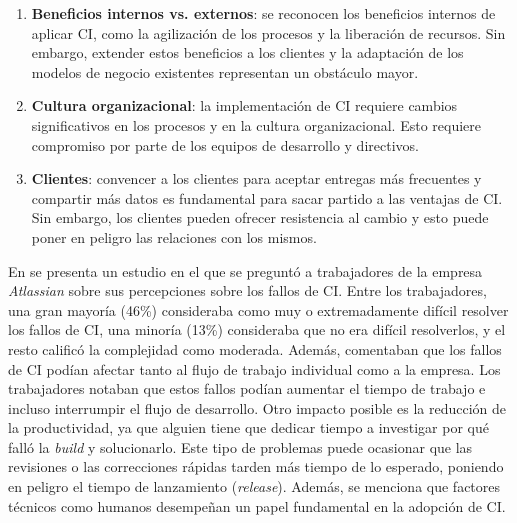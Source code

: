\begin{enumerate}
	\item \textbf{Beneficios internos vs. externos}: se reconocen los beneficios internos de
      aplicar CI, como la agilización de los procesos y la liberación de recursos. Sin
      embargo, extender estos beneficios a los clientes y la adaptación de los modelos de negocio
      existentes representan un obstáculo mayor.
	\item \textbf{Cultura organizacional}: la implementación de CI requiere cambios
      significativos en los procesos y en la cultura organizacional. Esto requiere compromiso por
      parte de los equipos de desarrollo y directivos.
	\item \textbf{Clientes}: convencer a los clientes para aceptar entregas más frecuentes y
      compartir más datos es fundamental para sacar partido a las ventajas de CI. Sin
      embargo, los clientes pueden ofrecer resistencia al cambio y esto puede poner en peligro
      las relaciones con los mismos.
\end{enumerate}

En \cite{17} se presenta un estudio en el que se preguntó a trabajadores de la empresa
\textit{Atlassian} sobre sus percepciones sobre los fallos de CI. Entre los trabajadores,
una gran mayoría (46\%) consideraba como muy o extremadamente difícil resolver los fallos de
CI, una minoría (13\%) consideraba que no era difícil resolverlos, y el resto calificó
la complejidad como moderada. Además, comentaban que los fallos de CI podían afectar tanto
al flujo de trabajo individual como a la empresa. Los trabajadores notaban que estos fallos podían
aumentar el tiempo de trabajo e incluso interrumpir el flujo de desarrollo. Otro impacto posible
es la reducción de la productividad, ya que alguien tiene que dedicar tiempo a investigar por qué
falló la \textit{build} y solucionarlo. Este tipo de problemas puede ocasionar que las revisiones
o las correcciones rápidas tarden más tiempo de lo esperado, poniendo en peligro el tiempo de
lanzamiento (\textit{release}). Además, se menciona que factores técnicos como humanos desempeñan
un papel fundamental en la adopción de CI.\\

